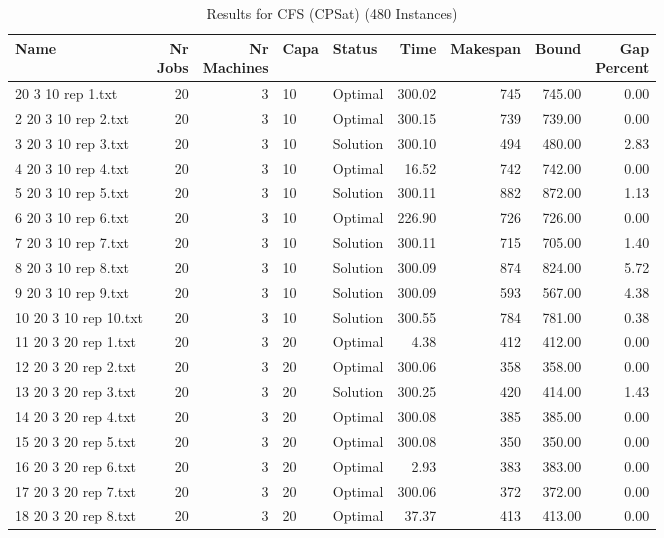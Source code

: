 \begin{longtable}{lrrllrrrr}
\caption{Results for CFS (CPSat) (480 Instances)}\\\toprule
Name & \shortstack{Nr\\Jobs} & \shortstack{Nr\\Machines} & Capa & Status  & Time & Makespan & Bound & \shortstack{Gap\\Percent}\\ \midrule
\endhead
\bottomrule
\endfoot
1 20 3 10 rep 1.txt & 20 & 3 & 10 & Optimal & 300.02 & 745 & 745.00 &  0.00\\
2 20 3 10 rep 2.txt & 20 & 3 & 10 & Optimal & 300.15 & 739 & 739.00 &  0.00\\
3 20 3 10 rep 3.txt & 20 & 3 & 10 & Solution & 300.10 & 494 & 480.00 &  2.83\\
4 20 3 10 rep 4.txt & 20 & 3 & 10 & Optimal & 16.52 & 742 & 742.00 &  0.00\\
5 20 3 10 rep 5.txt & 20 & 3 & 10 & Solution & 300.11 & 882 & 872.00 &  1.13\\
6 20 3 10 rep 6.txt & 20 & 3 & 10 & Optimal & 226.90 & 726 & 726.00 &  0.00\\
7 20 3 10 rep 7.txt & 20 & 3 & 10 & Solution & 300.11 & 715 & 705.00 &  1.40\\
8 20 3 10 rep 8.txt & 20 & 3 & 10 & Solution & 300.09 & 874 & 824.00 &  5.72\\
9 20 3 10 rep 9.txt & 20 & 3 & 10 & Solution & 300.09 & 593 & 567.00 &  4.38\\
10 20 3 10 rep 10.txt & 20 & 3 & 10 & Solution & 300.55 & 784 & 781.00 &  0.38\\
11 20 3 20 rep 1.txt & 20 & 3 & 20 & Optimal &  4.38 & 412 & 412.00 &  0.00\\
12 20 3 20 rep 2.txt & 20 & 3 & 20 & Optimal & 300.06 & 358 & 358.00 &  0.00\\
13 20 3 20 rep 3.txt & 20 & 3 & 20 & Solution & 300.25 & 420 & 414.00 &  1.43\\
14 20 3 20 rep 4.txt & 20 & 3 & 20 & Optimal & 300.08 & 385 & 385.00 &  0.00\\
15 20 3 20 rep 5.txt & 20 & 3 & 20 & Optimal & 300.08 & 350 & 350.00 &  0.00\\
16 20 3 20 rep 6.txt & 20 & 3 & 20 & Optimal &  2.93 & 383 & 383.00 &  0.00\\
17 20 3 20 rep 7.txt & 20 & 3 & 20 & Optimal & 300.06 & 372 & 372.00 &  0.00\\
18 20 3 20 rep 8.txt & 20 & 3 & 20 & Optimal & 37.37 & 413 & 413.00 &  0.00\\

\end{longtable}
